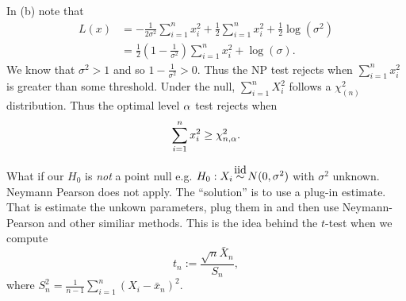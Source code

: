 \begin{ex}
    In (b) note that
    \begin{align*}
        L(x)&=-\frac{1}{2\sigma^2}\sum_{i=1}^n x_i^2 + \frac{1}{2}\sum_{i=1}^n x_i^2 + \frac{1}{2}\log(\sigma^2)\\
        &=\frac{1}{2}\left(1-\frac{1}{\sigma^2}\right)\sum_{i=1}^n x_i^2 + \log(\sigma).
    \end{align*}
    We know that $\sigma^2 > 1$ and so $1-\frac{1}{\sigma^2} > 0$. Thus the NP test rejects when $\sum_{i=1}^n x_i^2$ is greater than some threshold. Under the null, $\sum_{i=1}^n X_i^2$ follows a $\chi^2_{(n)}$ distribution. Thus the optimal level ${\alpha}$ test rejects when 
    \[\sum_{i=1}^n x_i^2 \ge \chi^2_{n,{\alpha}}. \]
\end{ex}
    What if our $H_0$ is \emph{not} a point null e.g. $H_0 : X_i \iid N(0,\sigma^2)$ with $\sigma^2$ unknown. Neymann Pearson does not apply. The ``solution'' is to use a plug-in estimate. That is estimate the unkown parameters, plug them in and then use Neymann-Pearson and other similiar methods. This is the idea behind the $t$-test when we compute
    \[t_n := \frac{\sqrt{n}\bar{X}_n}{S_n}, \]
    where $S_n^2 =\frac{1}{n-1}\sum_{i=1}^n (X_i-\bar{x}_n)^2$.
